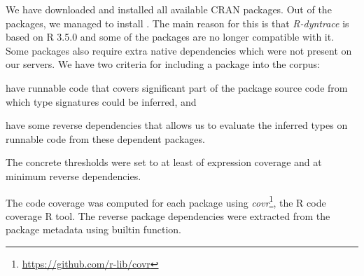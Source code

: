 \documentclass[acmsmall,review,anonymous]{acmart}\settopmatter{printfolios=true,printccs=false,printacmref=false}
\newcommand{\rdt}{\emph{R-dyntrace}\xspace}
\newcommand{\covr}{\emph{covr}\xspace}
\begin{document}
We have downloaded and installed all available CRAN packages. Out of the
\AllCranRnd packages, we managed to install \AllLoadableRnd. The main
reason for this is that \rdt is based on R 3.5.0 and some of the packages are no
longer compatible with it. Some packages also require extra native dependencies
which were not present on our servers.
We have two criteria for including a
package into the corpus:
\begin{inparaenum}[(1)]
\item have runnable code that covers significant part of the package source
code from which type signatures could be inferred, and
\item have some reverse dependencies that allows us to evaluate the inferred
types on runnable code from these dependent packages.
\end{inparaenum}
The concrete thresholds were set to at least \ThresholdCodeCoverage of expression
coverage and at minimum \ThresholdRevdeps reverse dependencies.

The code coverage was computed for each package using
\covr\footnote{\url{https://github.com/r-lib/covr}}, the R code coverage R tool.
The reverse package dependencies were extracted from the package metadata using
builtin function.





\end{document}
